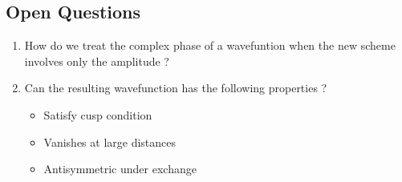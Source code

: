 \documentclass[12pt,a4paper]{article}
\begin{document}
\subsection{Open Questions}
\begin{enumerate}
  \item How do we treat the complex phase of a wavefuntion when  the new scheme involves only the amplitude ?
  \item Can the resulting wavefunction has the following properties ?
  \begin{itemize}
    \item Satisfy cusp condition
    \item Vanishes at large distances
    \item Antisymmetric under exchange
  \end{itemize}
\end{enumerate}

\newpage
\printbibliography
\end{document}
